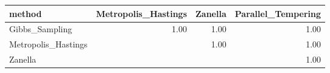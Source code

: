 \begin{table}[ht]
\centering
\begin{tabular}{lrrr}
  \hline
method & Metropolis\_Hastings & Zanella & Parallel\_Tempering \\ 
  \hline
Gibbs\_Sampling & 1.00 & 1.00 & 1.00 \\ 
  Metropolis\_Hastings &  & 1.00 & 1.00 \\ 
  Zanella &  &  & 1.00 \\ 
   \hline
\end{tabular}
\end{table}
